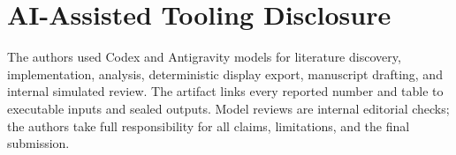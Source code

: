 \section*{AI-Assisted Tooling Disclosure}
The authors used Codex and Antigravity models for literature discovery, implementation, analysis, deterministic display export, manuscript drafting, and internal simulated review. The artifact links every reported number and table to executable inputs and sealed outputs. Model reviews are internal editorial checks; the authors take full responsibility for all claims, limitations, and the final submission.
